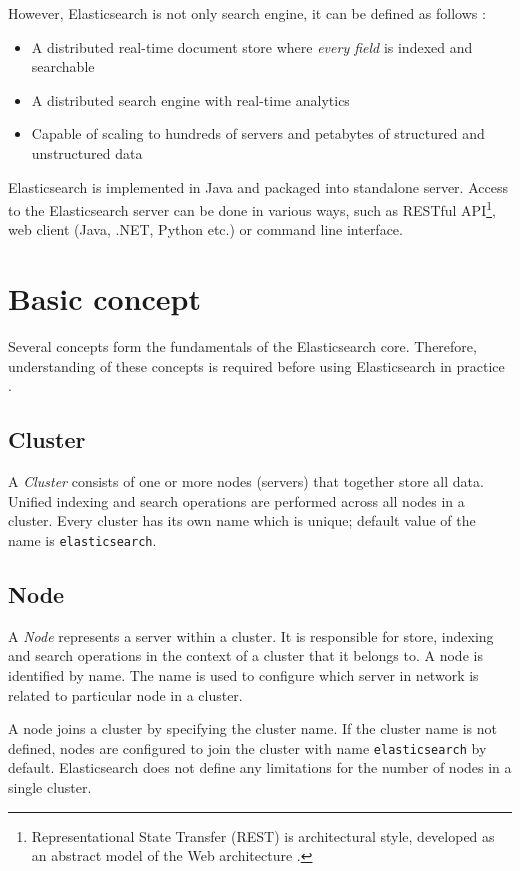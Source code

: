 \documentclass[12pt,oneside]{fithesis2}
\begin{document}
However, Elasticsearch is not only search engine, it can be defined as follows \cite{elasticsearch_defnitive_guide}:

\begin{itemize}
	\item A distributed real-time document store where \textit{every field} is indexed and searchable
	\item A distributed search engine with real-time analytics
	\item Capable of scaling to hundreds of servers and petabytes of structured and unstructured data
\end{itemize}

Elasticsearch is implemented in Java and packaged into standalone server. Access to the Elasticsearch server can be done in various ways, such as RESTful API\footnote{Representational State Transfer (REST) is architectural style, developed as an abstract model of the Web architecture \cite{rest}.}, web client (Java, .NET, Python etc.) or command line interface.


\section{Basic concept}
Several concepts form the fundamentals of the Elasticsearch core. Therefore, understanding of these concepts is required before using Elasticsearch in practice \cite{elasticsearch_doc}.

\subsection{Cluster}
A \textit{Cluster} consists of one or more nodes (servers) that together store all data. Unified indexing and search operations are performed across all nodes in a cluster. Every cluster has its own name which is unique; default value of the name is \verb|elasticsearch|.

\subsection{Node}
A \textit{Node} represents a server within a cluster. It is responsible for store, indexing and search operations in the context of a cluster that it belongs to. A node is identified by name. The name is used to configure which server in network is related to particular node in a cluster.

A node joins a cluster by specifying the cluster name. If the cluster name is not defined, nodes are configured to join the cluster with name \verb|elasticsearch| by default. Elasticsearch does not define any limitations for the number of nodes in a single cluster.
\end{document}
